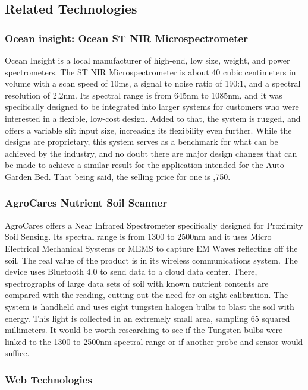 \subsection{Related Technologies}

\subsubsection{Ocean insight: Ocean ST NIR Microspectrometer}

Ocean Insight is a local manufacturer of high-end, low size, weight, and power spectrometers. The ST NIR Microspectrometer is about 40 cubic centimeters in volume with a scan speed of 10ms, a signal to noise ratio of 190:1, and a spectral resolution of 2.2nm. Its spectral range is from 645nm to 1085nm, and it was specifically designed to be integrated into larger systems for customers who were interested in a flexible, low-cost design. Added to that, the system is rugged, and offers a variable slit input size, increasing its flexibility even further. While the designs are proprietary, this system serves as a benchmark for what can be achieved by the industry, and no doubt there are major design changes that can be made to achieve a similar result for the application intended for the Auto Garden Bed. That being said, the selling price for one is ,750.

\subsubsection{AgroCares Nutrient Soil Scanner}

AgroCares offers a Near Infrared Spectrometer specifically designed for Proximity Soil Sensing. Its spectral range is from 1300 to 2500nm and it uses Micro Electrical Mechanical Systems or MEMS to capture EM Waves reflecting off the soil. The real value of the product is in its wireless communications system. The device uses Bluetooth 4.0 to send data to a cloud data center. There, spectrographs of large data sets of soil with known nutrient contents are compared with the reading, cutting out the need for on-sight calibration. The system is handheld and uses eight tungsten halogen bulbs to blast the soil with energy. This light is collected in an extremely small area, sampling 65 squared millimeters. It would be worth researching to see if the Tungsten bulbs were linked to the 1300 to 2500nm spectral range or if another probe and sensor would suffice.
\subsubsection{Web Technologies}
